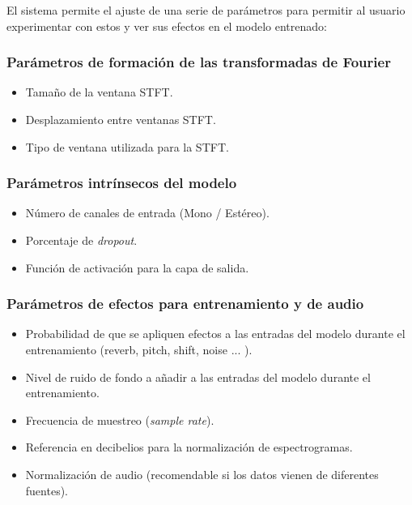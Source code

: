 El sistema permite el ajuste de una serie de parámetros para permitir al usuario experimentar con estos y ver sus efectos en el modelo entrenado:

\subsubsection{Parámetros de formación de las transformadas de Fourier}
\begin{itemize}
    \item Tamaño de la ventana STFT.
    \item Desplazamiento entre ventanas STFT.
    \item Tipo de ventana utilizada para la STFT.
\end{itemize}

\subsubsection{Parámetros intrínsecos del modelo}
\begin{itemize}
    \item Número de canales de entrada (Mono / Estéreo).
    \item Porcentaje de \textit{dropout}.
    \item Función de activación para la capa de salida.
\end{itemize}

\subsubsection{Parámetros de efectos para entrenamiento y de audio}
\begin{itemize}
    \item Probabilidad de que se apliquen efectos a las entradas del modelo durante el entrenamiento (reverb, pitch, shift, noise ... ).
    \item Nivel de ruido de fondo a añadir a las entradas del modelo durante el entrenamiento.
    \item Frecuencia de muestreo (\textit{sample rate}).
    \item Referencia en decibelios para la normalización de espectrogramas.
    \item Normalización de audio (recomendable si los datos vienen de diferentes fuentes).
\end{itemize}

